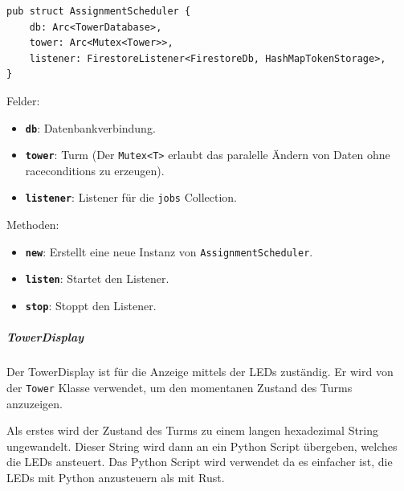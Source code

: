 \begin{verbatim}
pub struct AssignmentScheduler {
    db: Arc<TowerDatabase>,
    tower: Arc<Mutex<Tower>>,
    listener: FirestoreListener<FirestoreDb, HashMapTokenStorage>,
}
\end{verbatim}

Felder:
\begin{itemize}
  \item \textbf{\texttt{db}}: Datenbankverbindung.
  \item \textbf{\texttt{tower}}: Turm (Der \texttt{Mutex<T>} erlaubt das paralelle Ändern von Daten ohne \glspl{racecondition} zu erzeugen).
  \item \textbf{\texttt{listener}}: Listener für die \texttt{jobs} Collection.
\end{itemize}

Methoden:
\begin{itemize}
  \item \textbf{\texttt{new}}: Erstellt eine neue Instanz von \texttt{AssignmentScheduler}.
  \item \textbf{\texttt{listen}}: Startet den Listener.
  \item \textbf{\texttt{stop}}: Stoppt den Listener.
\end{itemize}


\subparagraph{TowerDisplay}

Der TowerDisplay ist für die Anzeige mittels der LEDs zuständig. Er wird von der \texttt{Tower} Klasse verwendet, um den momentanen Zustand des Turms anzuzeigen.

Als erstes wird der Zustand des Turms zu einem langen hexadezimal String ungewandelt. Dieser String wird dann an ein Python Script übergeben, welches die LEDs ansteuert. Das Python Script wird verwendet da es einfacher ist, die LEDs mit Python anzusteuern als mit Rust.